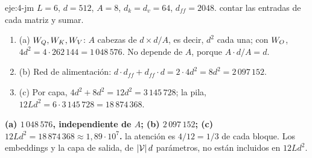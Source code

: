\begin{solucion}{eje:4-jm}
\datos $L=6$, $d=512$, $A=8$, $d_k=d_v=64$, $d_{ff}=2048$.
\planteamiento contar las entradas de cada matriz y sumar.
\pasos
\begin{enumerate}[label=\arabic*.]
  \item (a) $W_{Q},W_{K},W_{V}$: $A$ cabezas de $d\times d/A$, es decir, $d^{2}$ cada una; con $W_{O}$, $4d^{2}=4\cdot262\,144=1\,048\,576$. No depende de $A$, porque $A\cdot d/A=d$.
  \item (b) Red de alimentación: $d\cdot d_{ff}+d_{ff}\cdot d=2\cdot4d^{2}=8d^{2}=2\,097\,152$.
  \item (c) Por capa, $4d^{2}+8d^{2}=12d^{2}=3\,145\,728$; la pila, $12Ld^{2}=6\cdot3\,145\,728=18\,874\,368$.
\end{enumerate}
\resultado \textbf{(a) $1\,048\,576$, independiente de $A$; (b) $2\,097\,152$; (c) $12Ld^{2}=18\,874\,368\approx1{,}89\cdot10^{7}$.}
\comprobacion la atención es $4/12=1/3$ de cada bloque. Los embeddings y la capa de salida, de $\lvert\mathcal{V}\rvert\,d$ parámetros, no están incluidos en $12Ld^{2}$.
\end{solucion}

